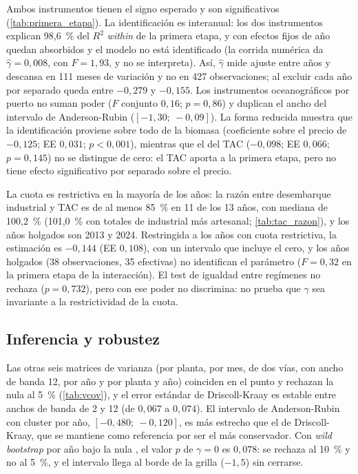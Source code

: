 \documentclass[11pt]{article}
\begin{document}
Ambos instrumentos tienen el signo esperado y son significativos (\autoref{tab:primera_etapa}). La identificación es interanual: los dos instrumentos explican 98,6~\% del $R^2$ \textit{within} de la primera etapa, y con efectos fijos de año quedan absorbidos y el modelo no está identificado (la corrida numérica da $\hat\gamma=0{,}008$, con $F=1{,}93$, y no se interpreta). Así, $\hat\gamma$ mide ajuste entre años y descansa en 111 meses de variación y no en 427 observaciones; al excluir cada año por separado queda entre $-0{,}279$ y $-0{,}155$. Los instrumentos oceanográficos por puerto no suman poder ($F$ conjunto $0{,}16$; $p=0{,}86$) y duplican el ancho del intervalo de Anderson-Rubin ($[-1{,}30;\ -0{,}09]$). La forma reducida muestra que la identificación proviene sobre todo de la biomasa (coeficiente sobre el precio de $-0{,}125$; EE $0{,}031$; $p<0{,}001$), mientras que el del TAC ($-0{,}098$; EE $0{,}066$; $p=0{,}145$) no se distingue de cero: el TAC aporta a la primera etapa, pero no tiene efecto significativo por separado sobre el precio.

La cuota es restrictiva en la mayoría de los años: la razón entre desembarque industrial y TAC es de al menos 85~\% en 11 de los 13 años, con mediana de 100,2~\% (101,0~\% con totales de industrial más artesanal; \autoref{tab:tac_razon}), y los años holgados son 2013 y 2024. Restringida a los años con cuota restrictiva, la estimación es $-0{,}144$ (EE $0{,}108$), con un intervalo que incluye el cero, y los años holgados (38 observaciones, 35 efectivas) no identifican el parámetro ($F=0{,}32$ en la primera etapa de la interacción). El test de igualdad entre regímenes no rechaza ($p=0{,}732$), pero con ese poder no discrimina: no prueba que $\gamma$ sea invariante a la restrictividad de la cuota.

\subsection{Inferencia y robustez}\label{sec:robustez}

Las otras seis matrices de varianza (por planta, por mes, de dos vías, con ancho de banda 12, por año y por planta y año) coinciden en el punto y rechazan la nula al 5~\% (\autoref{tab:vcov}), y el error estándar de Driscoll-Kraay es estable entre anchos de banda de 2 y 12 (de $0{,}067$ a $0{,}074$). El intervalo de Anderson-Rubin con cluster por año, $[-0{,}480;\ -0{,}120]$, es más estrecho que el de Driscoll-Kraay, que se mantiene como referencia por ser el más conservador. Con \textit{wild bootstrap} por año bajo la nula \parencite{cameron2008}, el valor $p$ de $\gamma=0$ es $0{,}078$: se rechaza al 10~\% y no al 5~\%, y el intervalo llega al borde de la grilla ($-1{,}5$) sin cerrarse.
\end{document}
